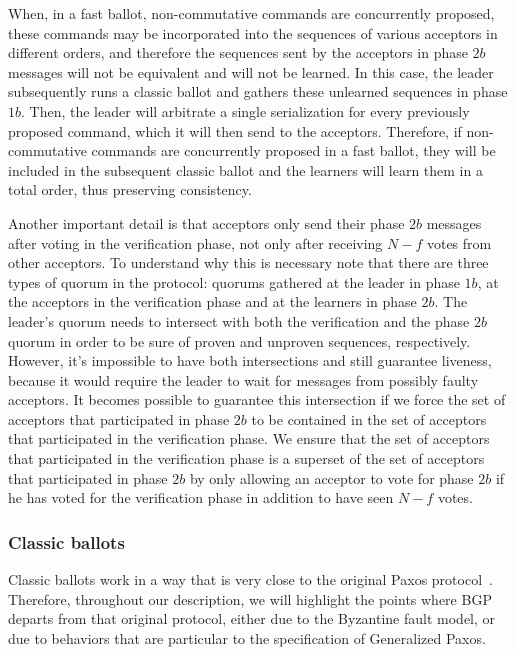  When, in a fast ballot, non-commutative commands are  concurrently proposed, these commands may be incorporated into the sequences of various acceptors in different orders, and therefore the sequences sent by the acceptors in phase $2b$ messages will not be equivalent and will not be learned. In this case, the leader subsequently runs a classic ballot and gathers these unlearned sequences in phase $1b$. Then, the leader will arbitrate a single serialization for every previously proposed command, which it will then send to the acceptors. Therefore, if non-commutative commands are concurrently proposed in a fast ballot, they will be included in the subsequent classic ballot and the learners will learn them in a total order, thus preserving consistency.\par
{} 
Another important detail is that acceptors only send their phase $2b$ messages after voting in the verification phase, not only after receiving $N-f$ votes from other acceptors. To understand why this is necessary note that there are three types of quorum in the protocol: quorums gathered at the leader in phase $1b$, at the acceptors in the verification phase and at the learners in phase $2b$. The leader's quorum needs to intersect with both the verification and the phase $2b$ quorum in order to be sure of proven and unproven sequences, respectively. However, it's impossible to have both intersections and still guarantee liveness, because it would require the leader to wait for messages from possibly faulty acceptors. It becomes possible to guarantee this intersection if we force the set of acceptors that participated in phase $2b$ to be contained in the set of acceptors that participated in the verification phase. We ensure that the set of acceptors that participated in the verification phase is a superset of the set of acceptors that participated in phase $2b$ by only allowing an acceptor to vote for phase $2b$ if he has voted for the verification phase in addition to have seen $N-f$ votes.

\subsubsection{Classic ballots} 

Classic ballots work in a way that is very close to the original Paxos protocol~\cite{Lam98}. Therefore, throughout our description, we will highlight the points where BGP departs from that original protocol, either due to the Byzantine fault model, or due to behaviors that are particular to the specification of Generalized Paxos.

